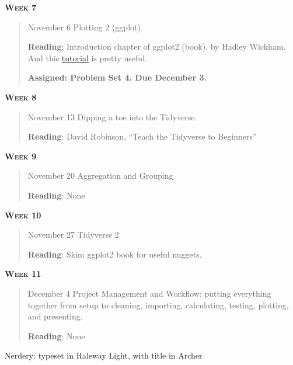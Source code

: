 \documentclass[11pt,letterpaper]{article}
\begin{document}
\textbf{\textsc{Week 7}}
		\begin{quote}	
		November 6  \textbullet \space Plotting 2 (ggplot). 
		
		\textbf{Reading}: Introduction chapter of ggplot2 (book), by Hadley Wickham.  And this \href{http://r-statistics.co/Complete-Ggplot2-Tutorial-Part1-With-R-Code.html}{\underline{tutorial}} is pretty useful.

		\textbf{Assigned: Problem Set 4.  Due December 3.}

		\end{quote}

\textbf{\textsc{Week 8}}
		\begin{quote}	
		November 13  \textbullet \space Dipping a toe into the Tidyverse. 
		
		\textbf{Reading}: David Robinson, ``Teach the Tidyverse to Beginners''
		\end{quote}

\textbf{\textsc{Week 9}}
		\begin{quote}	
		November 20  \textbullet \space Aggregation and Grouping 
		
		\textbf{Reading}: None
		\end{quote}

\textbf{\textsc{Week 10}}
		\begin{quote}	
		November 27 \textbullet \space Tidyverse 2
		
		\textbf{Reading}:  Skim ggplot2 book for useful nuggets.
		\end{quote}

\textbf{\textsc{Week 11}}
		\begin{quote}	
		December  4 \textbullet \space Project Management and Workflow: putting everything together from setup to cleaning, importing, calculating, testing, plotting, and presenting. 
		
		\textbf{Reading}:  None 
		\end{quote}



\vfill
{\tiny Nerdery: typeset in Raleway Light, with title in Archer}
\end{document}
